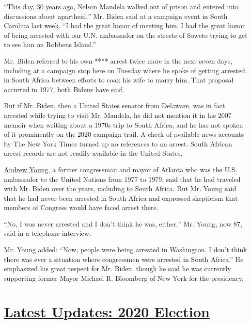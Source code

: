 ``This day, 30 years ago, Nelson Mandela walked out of prison and
entered into discussions about apartheid,'' Mr. Biden said at a campaign
event in South Carolina last week. ``I had the great honor of meeting
him. I had the great honor of being arrested with our U.N. ambassador on
the streets of Soweto trying to get to see him on Robbens Island.''

Mr. Biden referred to his own **** arrest twice more in the next seven
days, including at a campaign stop here on Tuesday where he spoke of
getting arrested in South Africa between efforts to coax his wife to
marry him. That proposal occurred in 1977, both Bidens have said.

But if Mr. Biden, then a United States senator from Delaware, was in
fact arrested while trying to visit Mr. Mandela, he did not mention it
in his 2007 memoir when writing about a 1970s trip to South Africa, and
he has not spoken of it prominently on the 2020 campaign trail. A check
of available news accounts by The New York Times turned up no references
to an arrest. South African arrest records are not readily available in
the United States.

\href{https://history.house.gov/People/Detail/21064}{Andrew Young}, a
former congressman and mayor of Atlanta who was the U.S. ambassador to
the United Nations from 1977 to 1979, said that he had traveled with Mr.
Biden over the years, including to South Africa. But Mr. Young said that
he had never been arrested in South Africa and expressed skepticism that
members of Congress would have faced arrest there.

``No, I was never arrested and I don't think he was, either,'' Mr.
Young, now 87, said in a telephone interview.

Mr. Young added: ``Now, people were being arrested in Washington. I
don't think there was ever a situation where congressmen were arrested
in South Africa.'' He emphasized his great respect for Mr. Biden, though
he said he was currently supporting former Mayor Michael R. Bloomberg of
New York for the presidency.

\hypertarget{latest-updates-2020-election}{%
\section{\texorpdfstring{\href{https://www.nytimes3xbfgragh.onion/live/2020/08/19/us/dnc-convention-election?action=click\&pgtype=Article\&state=default\&region=MAIN_CONTENT_1\&context=storylines_live_updates}{Latest
Updates: 2020
Election}}{Latest Updates: 2020 Election}}\label{latest-updates-2020-election}}

